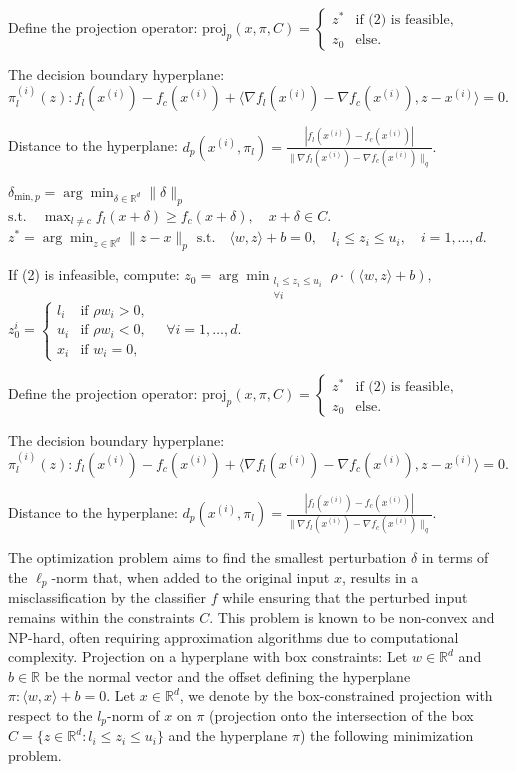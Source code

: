 Define the projection operator:
$\text{proj}_p(x, \pi, C) = \begin{cases} 
z^* & \text{if (2) is feasible}, \\
z_0 & \text{else}.
\end{cases}$

The decision boundary hyperplane:
$\pi_l^{(i)}(z) : f_l(x^{(i)}) - f_c(x^{(i)}) + \langle \nabla f_l(x^{(i)}) - \nabla f_c(x^{(i)}), z - x^{(i)} \rangle = 0.$

Distance to the hyperplane:
$d_p(x^{(i)}, \pi_l) = \frac{|f_l(x^{(i)}) - f_c(x^{(i)})|}{\|\nabla f_l(x^{(i)}) - \nabla f_c(x^{(i)})\|_q}.$

$\delta_{\text{min},p} = \arg \min_{\delta \in \mathbb{R}^d} \|\delta\|_p$
$\text{s.t.} \quad \max_{l \neq c} f_l(x + \delta) \geq f_c(x + \delta), \quad x + \delta \in C.$
$z^* = \arg \min_{z \in \mathbb{R}^d} \|z - x\|_p$
$\text{s.t.} \quad \langle w, z \rangle + b = 0, \quad l_i \leq z_i \leq u_i, \quad i = 1, \dots, d.$

If (2) is infeasible, compute:
$z_0 = \arg \min_{\substack{l_i \leq z_i \leq u_i \\ \forall i}} \rho \cdot (\langle w, z \rangle + b),$
$z_0^i = \begin{cases} 
l_i & \text{if } \rho w_i > 0, \\
u_i & \text{if } \rho w_i < 0, \\
x_i & \text{if } w_i = 0,
\end{cases}
\quad \forall i = 1, \dots, d.$

Define the projection operator:
$\text{proj}_p(x, \pi, C) = \begin{cases} 
z^* & \text{if (2) is feasible}, \\
z_0 & \text{else}.
\end{cases}$

The decision boundary hyperplane:
$\pi_l^{(i)}(z) : f_l(x^{(i)}) - f_c(x^{(i)}) + \langle \nabla f_l(x^{(i)}) - \nabla f_c(x^{(i)}), z - x^{(i)} \rangle = 0.$

Distance to the hyperplane:
$d_p(x^{(i)}, \pi_l) = \frac{|f_l(x^{(i)}) - f_c(x^{(i)})|}{\|\nabla f_l(x^{(i)}) - \nabla f_c(x^{(i)})\|_q}.$

The optimization problem aims to find the smallest perturbation $\delta$ in terms of the $\ell_p$-norm that, when added to the original input $x$, results in a misclassification by the classifier $f$ while ensuring that the perturbed input remains within the constraints $C$. This problem is known to be non-convex and NP-hard, often requiring approximation algorithms due to computational complexity.
Projection on a hyperplane with box constraints: Let $w \in \mathbb{R}^d$ and $b \in \mathbb{R}$ be the normal vector and the offset defining the hyperplane $\pi : \langle w, x \rangle + b = 0$. Let $x \in \mathbb{R}^d$, we denote by the box-constrained projection with respect to the $l_p$-norm of $x$ on $\pi$ (projection onto the intersection of the box $C = \{ z \in \mathbb{R}^d : l_i \leq z_i \leq u_i \}$ and the hyperplane $\pi$) the following minimization problem.

